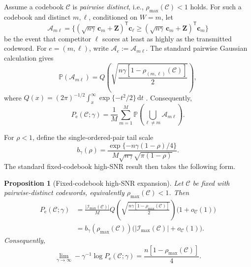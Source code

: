 \documentclass[12pt,draftclsnofoot,onecolumn]{IEEEtran}
\newcommand{\Pp}{\mathbb{P}}
\newcommand{\cA}{\mathcal{A}}
\newcommand{\cC}{\mathcal{C}}
\newcommand{\cI}{\mathcal{I}}
\newcommand{\dd}{\,\mathrm{d}}
\newcommand{\Pe}{P_{\mathrm e}}
\newcommand{\Qfun}{Q}
\newcommand{\bc}{\bm c}
\newcommand{\bZ}{\bm Z}
\newcommand{\T}{\mathsf T}
\newtheorem{proposition}{Proposition}
\theoremstyle{definition}
\begin{document}
Assume a codebook \(\cC\) is \emph{pairwise distinct}, i.e.,
\(\rho_{\max}(\cC)<1\) holds.  For such a codebook and distinct \(m,\ell\),
conditioned on \(W=m\), let
\begin{equation*}
  \cA_{m\ell}
  =
  \{(\sqrt{n\gamma}\,\bc_m+\bZ)^\T\bc_\ell
  \ge(\sqrt{n\gamma}\,\bc_m+\bZ)^\T\bc_m\}
\end{equation*}
be the event that competitor \(\ell\) scores at least as highly as the
transmitted codeword.  For \(e=(m,\ell)\), write
\(\cA_e:=\cA_{m\ell}\).  The standard pairwise Gaussian calculation gives
\begin{equation}
  \Pp(\cA_{m\ell})
  =
  \Qfun\!\left(
  \sqrt{\frac{n\gamma[1-\rho_{(m,\ell)}(\cC)]}{2}}
  \right),
  \label{eq:pairwise-tail}
\end{equation}
where
\(\Qfun(x)=(2\pi)^{-1/2}\int_x^\infty\exp\{-t^2/2\}\dd t\)
\cite{Proakis2001}.  Consequently,
\begin{equation}
  \Pe(\cC;\gamma)
  =\frac1M\sum_{m=1}^M
  \Pp\!\left(\bigcup_{\ell\ne m}\cA_{m\ell}\right).
  \label{eq:exact-error-event-union}
\end{equation}

For \(\rho<1\), define the single-ordered-pair tail scale
\begin{equation}
  b_\gamma(\rho)
  =
  \frac{\exp\{-n\gamma(1-\rho)/4\}}
  {M\sqrt{n\gamma}\sqrt{\pi(1-\rho)}}.
  \label{eq:pairwise-tail-scale}
\end{equation}
The standard fixed-codebook high-SNR result then takes the following
form.

\begin{proposition}[Fixed-codebook high-SNR expansion]
\label{prop:fixed-codebook-asymptotics}
Let \(\cC\) be fixed with pairwise-distinct codewords, equivalently
\(\rho_{\max}(\cC)<1\).  Then
\begin{equation}
\begin{aligned}
  \Pe(\cC;\gamma)
  &=\frac{|\cI_{\max}(\cC)|}{M}
  \Qfun\!\left(
  \sqrt{\frac{n\gamma[1-\rho_{\max}(\cC)]}{2}}
  \right)\bigl(1+o_{\cC}(1)\bigr)\\
  &=b_\gamma(\rho_{\max}(\cC))
  \bigl(|\cI_{\max}(\cC)|+o_{\cC}(1)\bigr).
\end{aligned}
  \label{eq:fixed-codebook-leading-expansion}
\end{equation}
Consequently,
\begin{equation}
  \lim_{\gamma\to\infty}-\gamma^{-1}\log\Pe(\cC;\gamma)
  =\frac{n[1-\rho_{\max}(\cC)]}{4}.
  \label{eq:fixed-codebook-error-exponent}
\end{equation}
\end{proposition}
\end{document}
